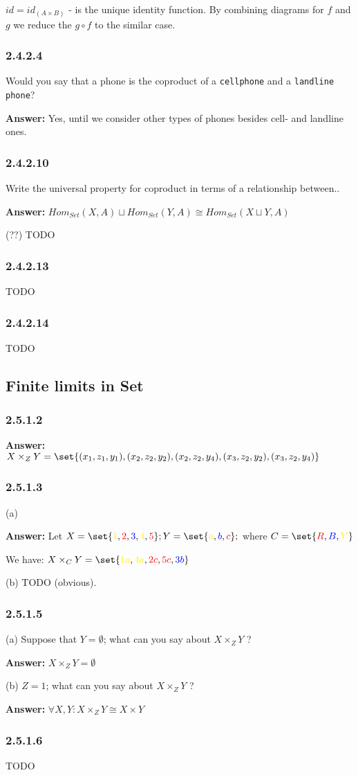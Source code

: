 \documentclass{article}
\newcommand{\R}[1]{\begingroup\color{red}#1\endgroup}
\newcommand{\B}[1]{\begingroup\color{blue}#1\endgroup}
\newcommand{\Y}[1]{\begingroup\color{yellow}#1\endgroup}
\newcommand{\vsp}[0]{\vspace*{10pt}\par}
\newcommand{\exercise}[1]{\subsubsection*{#1}}
\newcommand{\ans}[0]{\vsp\textbf{Answer: }}
\begin{document}
$id = id_{(A \times B)}$ - is the unique identity function. By combining diagrams for $f$ and $g$ we
reduce the $g \circ f$ to the similar case.

\exercise{2.4.2.4}

Would you say that a phone is the coproduct of a \texttt{cellphone} and a \texttt{landline phone}?

\ans
Yes, until we consider other types of phones besides cell- and landline ones.

\exercise{2.4.2.10}

Write the universal property for coproduct in terms of a relationship between..

\ans $Hom_{Set}(X,A) \sqcup Hom_{Set}(Y,A) \cong Hom_{Set}(X \sqcup Y, A)$

(??) TODO

\exercise{2.4.2.13}

TODO

\exercise{2.4.2.14}

TODO


\subsection{Finite limits in Set}

\exercise{2.5.1.2}

\ans $X \times_{Z} Y = \set{(x_1,z_1,y_1), (x_2,z_2,y_2), (x_2,z_2,y_4), (x_3,z_2,y_2),
(x_3,z_2,y_4)}$


\exercise{2.5.1.3}

(a)
\ans Let $X = \set{\Y{1},\R{2},\B{3},\Y{4},\R{5}}; Y = \set{\Y{a},\B{b},\R{c}};$ where
$C = \set{\R{R},\B{B},\Y{Y}}$ \vsp We have:
$X \times_C Y = \set{\Y{1a},\Y{4a},\R{2c},\R{5c},\B{3b}}$

(b)
TODO (obvious).

\exercise{2.5.1.5}

(a) Suppose that $Y = \emptyset$; what can you say about $X \times_Z Y$ ?
\ans $X \times_Z Y = \emptyset$ \vsp

(b) $Z = {1}$; what can you say about $X \times_Z Y$ ?
\ans $\forall X,Y : X \times_Z Y \cong X \times Y$

\exercise{2.5.1.6}

TODO

\vsp
\vsp
\vsp

\printbibliography
\end{document}
